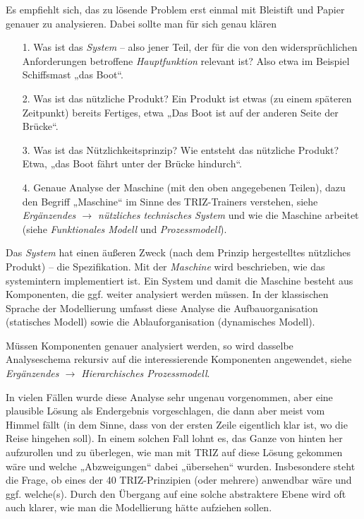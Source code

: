 \documentclass[11pt,a4paper]{article}
\begin{document}
Es empfiehlt sich, das zu lösende Problem erst einmal mit Bleistift und Papier
genauer zu analysieren. Dabei sollte man für sich genau klären
\begin{itemize}
\item[1.] Was ist das \emph{System} -- also jener Teil, der für die von den
  widersprüchlichen Anforderungen betroffene \emph{Hauptfunktion} relevant
  ist? Also etwa im Beispiel Schiffsmast „das Boot“.

\item[2.] Was ist das nützliche Produkt? Ein Produkt ist etwas (zu einem
  späteren Zeitpunkt) bereits Fertiges, etwa „Das Boot ist auf der anderen
  Seite der Brücke“.

\item[3.] Was ist das Nützlichkeitsprinzip? Wie entsteht das nützliche
  Produkt? Etwa, „das Boot fährt unter der Brücke hindurch“.

\item[4.] Genaue Analyse der Maschine (mit den oben angegebenen Teilen), dazu
  den Begriff „Maschine“ im Sinne des TRIZ-Trainers verstehen, siehe
  \emph{Ergänzendes $\to$ nützliches technisches System} und wie die Maschine
  arbeitet (siehe \emph{Funktionales Modell} und \emph{Prozessmodell}).
\end{itemize}
Das \emph{System} hat einen äußeren Zweck (nach dem Prinzip hergestelltes
nützliches Produkt) -- die Spezifikation. Mit der \emph{Maschine} wird
beschrieben, wie das systemintern implementiert ist. Ein System und damit die
Maschine besteht aus Komponenten, die ggf. weiter analysiert werden müssen.
In der klassischen Sprache der Modellierung umfasst diese Analyse die
Aufbauorganisation (statisches Modell) sowie die Ablauforganisation
(dynamisches Modell).

Müssen Komponenten genauer analysiert werden, so wird dasselbe Analyseschema
rekursiv auf die interessierende Komponenten angewendet, siehe
\emph{Ergänzendes $\to$ Hierarchisches Prozessmodell}.

In vielen Fällen wurde diese Analyse sehr ungenau vorgenommen, aber eine
plausible Lösung als Endergebnis vorgeschlagen, die dann aber meist vom Himmel
fällt (in dem Sinne, dass von der ersten Zeile eigentlich klar ist, wo die
Reise hingehen soll). In einem solchen Fall lohnt es, das Ganze von hinten her
aufzurollen und zu überlegen, wie man mit TRIZ auf diese Lösung gekommen wäre
und welche „Abzweigungen“ dabei „übersehen“ wurden. Insbesondere steht die
Frage, ob eines der 40 TRIZ-Prinzipien (oder mehrere) anwendbar wäre und
ggf. welche(s). Durch den Übergang auf eine solche abstraktere Ebene wird oft
auch klarer, wie man die Modellierung hätte aufziehen sollen.
\end{document}

